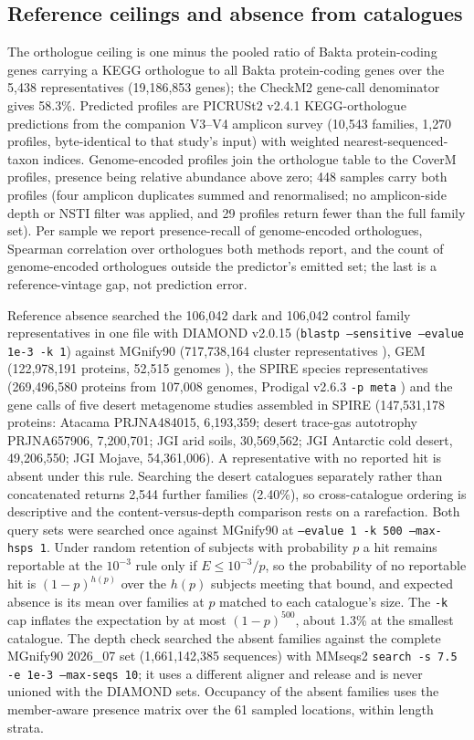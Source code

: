 \documentclass[11pt]{article}
\begin{document}
\subsection*{Reference ceilings and absence from catalogues}
The orthologue ceiling is one minus the pooled ratio of Bakta protein-coding genes carrying a KEGG
orthologue to all Bakta protein-coding genes over the 5{,}438 representatives (19{,}186{,}853 genes);
the CheckM2 gene-call denominator gives 58.3\%. Predicted profiles are PICRUSt2 v2.4.1
\citep{douglas2020picrust2} KEGG-orthologue predictions from the companion V3--V4 amplicon survey
(10{,}543 families, 1{,}270 profiles, byte-identical to that study's input) with weighted
nearest-sequenced-taxon indices. Genome-encoded profiles join the orthologue table to the CoverM
profiles, presence being relative abundance above zero; 448 samples carry both profiles (four
amplicon duplicates summed and renormalised; no amplicon-side depth or NSTI filter was applied, and
29 profiles return fewer than the full family set). Per sample we report presence-recall of
genome-encoded orthologues, Spearman correlation over orthologues both methods report, and the count
of genome-encoded orthologues outside the predictor's emitted set; the last is a reference-vintage
gap, not prediction error.

Reference absence searched the 106{,}042 dark and 106{,}042 control family representatives in one
file with DIAMOND v2.0.15 (\texttt{blastp --sensitive --evalue 1e-3 -k 1}) against MGnify90
(717{,}738{,}164 cluster representatives \citep{richardson2023mgnify}), GEM (122{,}978{,}191
proteins, 52{,}515 genomes \citep{nayfach2021gem}), the SPIRE species representatives (269{,}496{,}580
proteins from 107{,}008 genomes, Prodigal v2.6.3 \texttt{-p meta} \citep{schmidt2024spire}) and the
gene calls of five desert metagenome studies assembled in SPIRE (147{,}531{,}178 proteins: Atacama
PRJNA484015, 6{,}193{,}359; desert trace-gas autotrophy PRJNA657906, 7{,}200{,}701; JGI arid soils,
30{,}569{,}562; JGI Antarctic cold desert, 49{,}206{,}550; JGI Mojave, 54{,}361{,}006). A
representative with no reported hit is absent under this rule. Searching the desert catalogues
separately rather than concatenated returns 2{,}544 further families (2.40\%), so cross-catalogue
ordering is descriptive and the content-versus-depth comparison rests on a rarefaction. Both query
sets were searched once against MGnify90 at \texttt{--evalue 1 -k 500 --max-hsps 1}. Under random
retention of subjects with probability $p$ a hit remains reportable at the $10^{-3}$ rule only if
$E \leq 10^{-3}/p$, so the probability of no reportable hit is $(1-p)^{h(p)}$ over the $h(p)$ subjects
meeting that bound, and expected absence is its mean over families at $p$ matched to each catalogue's
size. The \texttt{-k} cap inflates the expectation by at most $(1-p)^{500}$, about 1.3\% at the
smallest catalogue. The depth check searched the absent families against the complete MGnify90
2026\_07 set (1{,}661{,}142{,}385 sequences) with MMseqs2 \texttt{search -s 7.5 -e 1e-3 --max-seqs 10};
it uses a different aligner and release and is never unioned with the DIAMOND sets. Occupancy of the
absent families uses the member-aware presence matrix over the 61 sampled locations, within length strata.
\end{document}
